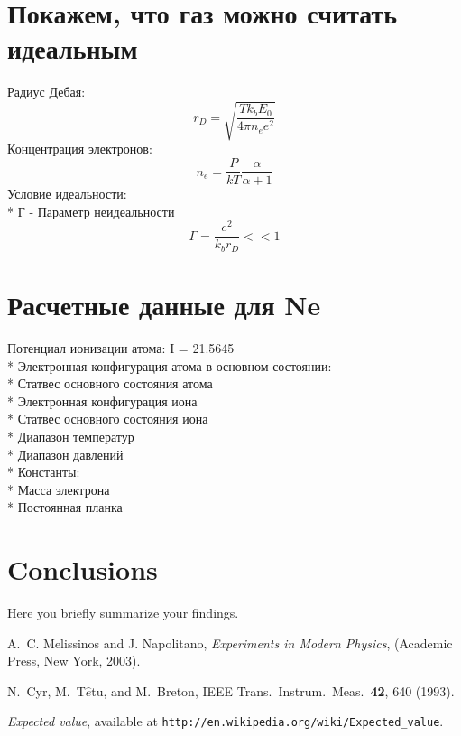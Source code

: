 \documentclass[letterpaper,12pt]{article}
\begin{document}
\section{Покажем, что газ можно считать идеальным}
Радиус Дебая:
\begin{equation}
r_D=\sqrt{\frac{Tk_bE_0}{4\pi n_e e^2}}
\end{equation}
Концентрация электронов:
\begin{equation}
n_e=\frac{P}{kT} \frac{\alpha}{\alpha + 1}
\end{equation}
Условие идеальности:\\*
Г - Параметр неидеальности
\begin{equation}
\Gamma = \frac{e^2}{k_b r_D}< < 1
\end{equation}
\section{Расчетные данные для Ne}
Потенциал ионизации атома: I = 21.5645 
\\* Электронная конфигурация атома в основном состоянии: 
\\* Статвес основного состояния атома 
\\* Электронная конфигурация иона 
\\* Статвес основного состояния иона 
\\* Диапазон температур 
\\* Диапазон давлений 
\\* Константы: 
\\* Масса электрона 
\\* Постоянная планка

\section{Conclusions}
Here you briefly summarize your findings.


\begin{thebibliography}{99}

A.~C. Melissinos and J. Napolitano, \textit{Experiments in Modern Physics},
(Academic Press, New York, 2003).

N.\ Cyr, M.\ T$\hat{e}$tu, and M.\ Breton,
IEEE Trans.\ Instrum.\ Meas.\ \textbf{42}, 640 (1993).

 \emph{Expected value},  available at
\texttt{http://en.wikipedia.org/wiki/Expected\_value}.

\end{thebibliography}
\end{document}
